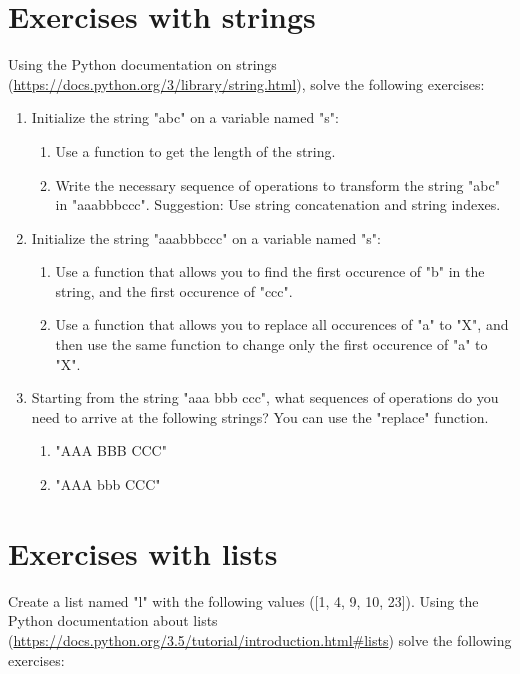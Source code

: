 \section{Exercises with strings}

Using the Python documentation on strings (\url{https://docs.python.org/3/library/string.html}), solve the following exercises:

\begin{enumerate}

\item Initialize the string "abc" on a variable named "s":
\begin{enumerate}
\item Use a function to get the length of the string.
\item Write the necessary sequence of operations to transform the string "abc" in "aaabbbccc". Suggestion: Use string concatenation and string indexes.
\end{enumerate}

\item Initialize the string "aaabbbccc" on a variable named "s":
\begin{enumerate}
\item Use a function that allows you to find the first occurence of "b" in the string, and the first occurence of "ccc".
\item Use a function that allows you to replace all occurences of "a" to "X", and then use the same function to change only the first occurence of "a" to "X".
\end{enumerate}

\item Starting from the string "aaa bbb ccc", what sequences of operations do you need to arrive at the following strings? You can use the "replace" function.
\begin{enumerate}
\item "AAA BBB CCC"
\item "AAA bbb CCC"
\end{enumerate}

\end{enumerate}

\section{Exercises with lists}

Create a list named "l" with the following values ([1, 4, 9, 10, 23]). Using the Python documentation about lists (\url{https://docs.python.org/3.5/tutorial/introduction.html#lists}) solve the following exercises:

